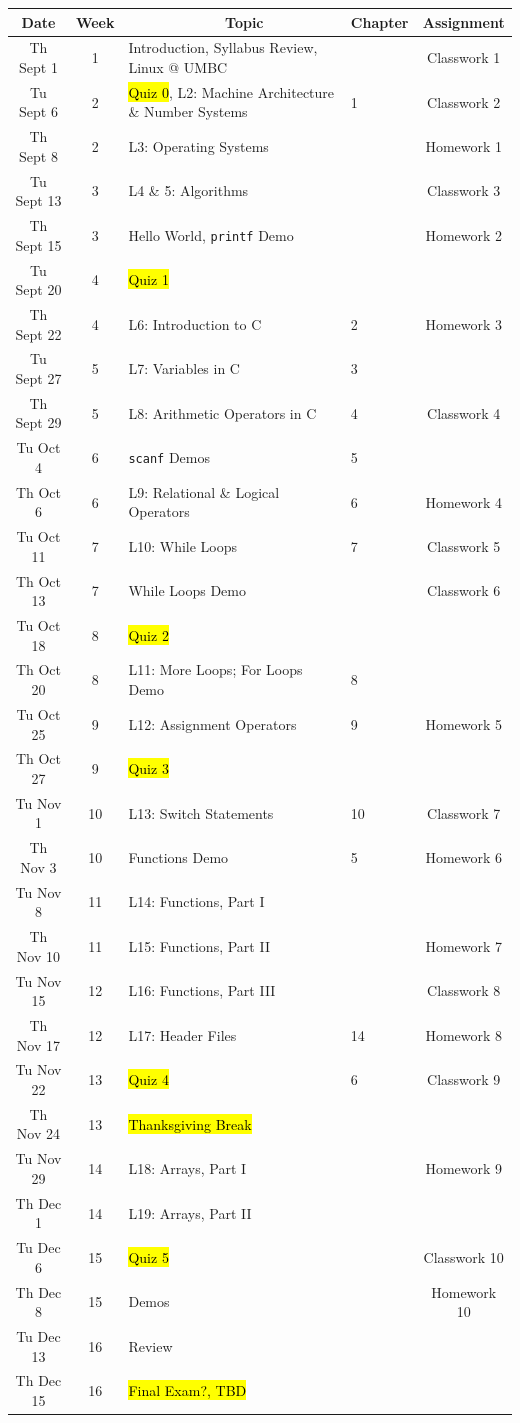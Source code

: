 \documentclass[letter,11pt]{article}
\begin{document}
\small
\begin{tabular}{c c l l c}
Date & Week & ~~~~~~~~~~~~Topic & Chapter & Assignment \\
\hline
Th Sept 1  & 1  & Introduction, Syllabus Review, Linux @ UMBC & & Classwork 1  \\
Tu Sept 6  & 2  & \hl{Quiz 0}, L2: Machine Architecture \& Number Systems & 1 & Classwork 2 \\
Th Sept 8  & 2  & L3: Operating Systems & & Homework 1 \\
Tu Sept 13 & 3  & L4 \& 5: Algorithms & & Classwork 3 \\
Th Sept 15 & 3  & Hello World, \texttt{printf} Demo & & Homework 2 \\
Tu Sept 20 & 4  & \hl{Quiz 1} & &  \\
Th Sept 22 & 4  & L6: Introduction to C & 2 & Homework 3 \\
Tu Sept 27 & 5  & L7: Variables in C & 3 \\
Th Sept 29 & 5  & L8: Arithmetic Operators in C & 4 & Classwork 4 \\ \hline
Tu Oct 4   & 6  & \texttt{scanf} Demos & 5 & \\
Th Oct 6   & 6  & L9: Relational \& Logical Operators & 6 & Homework 4 \\
Tu Oct 11  & 7  & L10: While Loops & 7 & Classwork 5 \\
Th Oct 13  & 7  & While Loops Demo & & Classwork 6 \\
Tu Oct 18  & 8  & \hl{Quiz 2} & & \\
Th Oct 20  & 8  & L11: More Loops; For Loops Demo & 8 & \\
Tu Oct 25  & 9  & L12: Assignment Operators & 9 & Homework 5 \\
Th Oct 27  & 9  & \hl{Quiz 3} & & \\ \hline
Tu Nov 1   & 10 & L13: Switch Statements & 10 & Classwork 7 \\
Th Nov 3   & 10 & Functions Demo  & 5 & Homework 6 \\
Tu Nov 8   & 11 & L14: Functions, Part I  & \\
Th Nov 10  & 11 & L15: Functions, Part II & & Homework 7 \\
Tu Nov 15  & 12 & L16: Functions, Part III & & Classwork 8 \\
Th Nov 17  & 12 & L17: Header Files & 14 & Homework 8 \\
Tu Nov 22  & 13 & \hl{Quiz 4} & 6 & Classwork 9 \\
Th Nov 24  & 13 & \hl{Thanksgiving Break} & & \\
Tu Nov 29  & 14 & L18: Arrays, Part I &  & Homework 9 \\ \hline
Th Dec 1   & 14 & L19: Arrays, Part II &  \\
Tu Dec 6   & 15 & \hl{Quiz 5} & & Classwork 10 \\
Th Dec 8   & 15 & Demos & & Homework 10 \\
Tu Dec 13  & 16 & Review &  \\
Th Dec 15  & 16 & \hl{Final Exam?, TBD} & \\
\end{tabular}
\end{document}
